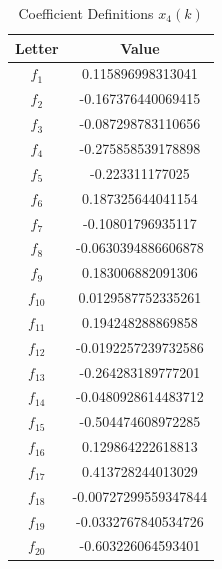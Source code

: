 \begin{table}[H]
\centering
\caption{Coefficient Definitions $x_{4}(k)$}
\label{tab:coefficients4}
\begin{tabular}{|c|c|}
\hline
\textbf{Letter} & \textbf{Value} \\
\hline
$f_1$ & 0.115896998313041 \\
$f_2$ & -0.167376440069415 \\
$f_3$ & -0.087298783110656 \\
$f_4$ & -0.275858539178898 \\
$f_5$ & -0.223311177025 \\
$f_6$ & 0.187325644041154 \\
$f_7$ & -0.10801796935117 \\
$f_8$ & -0.0630394886606878 \\
$f_9$ & 0.183006882091306 \\
$f_{10}$ & 0.0129587752335261 \\
$f_{11}$ & 0.194248288869858 \\
$f_{12}$ & -0.0192257239732586 \\
$f_{13}$ & -0.264283189777201 \\
$f_{14}$ & -0.0480928614483712 \\
$f_{15}$ & -0.504474608972285 \\
$f_{16}$ & 0.129864222618813 \\
$f_{17}$ & 0.413728244013029 \\
$f_{18}$ & -0.00727299559347844 \\
$f_{19}$ & -0.0332767840534726 \\
$f_{20}$ & -0.603226064593401 \\
\hline
\end{tabular}
\end{table}